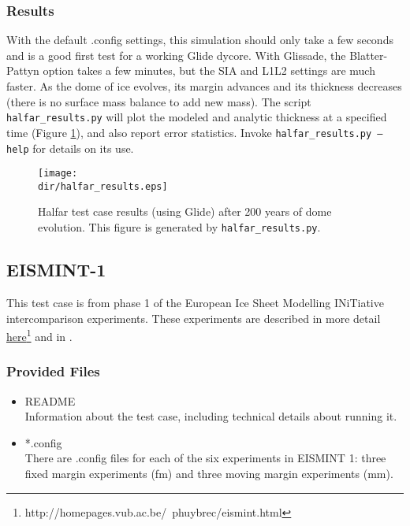 \subsubsection{Results}
\label{subsecc:halfar_results}
With the default .config settings, this simulation should only take a few seconds and is a good first test for a working Glide dycore.
With Glissade, the Blatter-Pattyn option takes a few minutes, but the SIA and L1L2 settings are much faster.
As the dome of ice evolves, its margin advances and its thickness decreases (there is no surface mass balance to add new mass).  
The script \texttt{halfar\_results.py} will plot the modeled and analytic thickness at a specified time (Figure \ref{fig:halfarresults}), 
and also report error statistics.  Invoke \texttt{halfar\_results.py --help} for details on its use.

\begin{figure}[H]
	\centering
	\texttt{[image: \\dir/halfar\_results.eps]}
	\caption{Halfar test case results (using Glide) after 200 years of dome evolution. This figure is generated by \texttt{halfar\_results.py}.}
	\label{fig:halfarresults}
\end{figure}


\FloatBarrier


\subsection{EISMINT-1}
\label{sec:eismint_description}
This test case is from phase 1 of the European Ice Sheet Modelling INiTiative intercomparison experiments.  These experiments are described in more detail
\href{http://homepages.vub.ac.be/~phuybrec/eismint.html}{here}\footnote{http://homepages.vub.ac.be/~phuybrec/eismint.html} and in \citet{Huybrechts1996}.

\subsubsection{Provided Files}
\label{subsec:eismint_files}

\begin{itemize}
	\item README \\
	Information about the test case, including technical details about running it.
	\item *.config \\
  	There are .config files for each of the six experiments in EISMINT 1: three fixed margin experiments (fm) and three moving margin experiments (mm).
\end{itemize}

